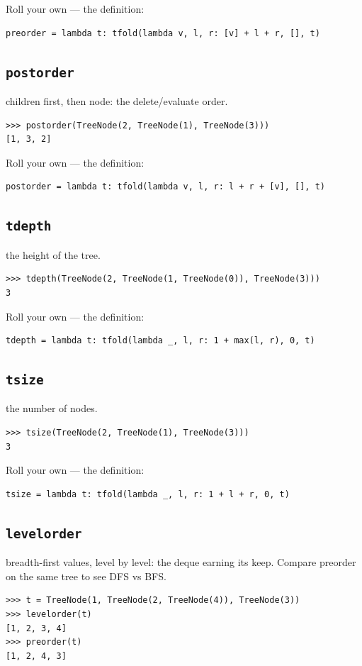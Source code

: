\documentclass[10pt,letterpaper]{book}
\begin{document}
Roll your own --- the definition:

\begin{lstlisting}[style=ex]
preorder = lambda t: tfold(lambda v, l, r: [v] + l + r, [], t)
\end{lstlisting}
\subsection{\texttt{postorder}}\label{def:postorder}
children first, then node: the delete/evaluate order.
\begin{lstlisting}[style=ex]
>>> postorder(TreeNode(2, TreeNode(1), TreeNode(3)))
[1, 3, 2]
\end{lstlisting}

Roll your own --- the definition:

\begin{lstlisting}[style=ex]
postorder = lambda t: tfold(lambda v, l, r: l + r + [v], [], t)
\end{lstlisting}
\subsection{\texttt{tdepth}}\label{def:tdepth}
the height of the tree.
\begin{lstlisting}[style=ex]
>>> tdepth(TreeNode(2, TreeNode(1, TreeNode(0)), TreeNode(3)))
3
\end{lstlisting}

Roll your own --- the definition:

\begin{lstlisting}[style=ex]
tdepth = lambda t: tfold(lambda _, l, r: 1 + max(l, r), 0, t)
\end{lstlisting}
\subsection{\texttt{tsize}}\label{def:tsize}
the number of nodes.
\begin{lstlisting}[style=ex]
>>> tsize(TreeNode(2, TreeNode(1), TreeNode(3)))
3
\end{lstlisting}

Roll your own --- the definition:

\begin{lstlisting}[style=ex]
tsize = lambda t: tfold(lambda _, l, r: 1 + l + r, 0, t)
\end{lstlisting}
\subsection{\texttt{levelorder}}\label{def:levelorder}
breadth-first values, level by level: the deque earning its keep. Compare preorder on the same tree to see DFS vs BFS.
\begin{lstlisting}[style=ex]
>>> t = TreeNode(1, TreeNode(2, TreeNode(4)), TreeNode(3))
>>> levelorder(t)
[1, 2, 3, 4]
>>> preorder(t)
[1, 2, 4, 3]
\end{lstlisting}
\end{document}
